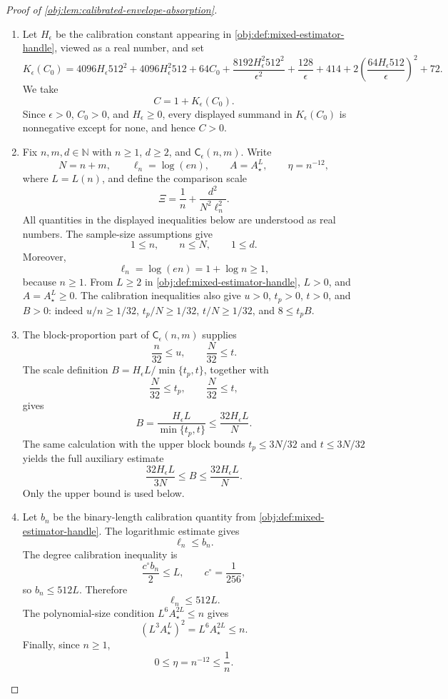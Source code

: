 \begin{proof}[Proof of \cref{obj:lem:calibrated-envelope-absorption}]
\begin{enumerate}
\item Let \(H_\epsilon\) be the calibration constant appearing in \cref{obj:def:mixed-estimator-handle}, viewed as a real number, and set
\[
K_\epsilon(C_0)
=
4096H_\epsilon 512^2+4096H_\epsilon^2 512+64C_0
+\frac{8192H_\epsilon^2 512^2}{\epsilon^2}
+\frac{128}{\epsilon}+414
+2\left(\frac{64H_\epsilon 512}{\epsilon}\right)^2+72 .
\]
We take
\[
C=1+K_\epsilon(C_0).
\]
Since \(\epsilon>0\), \(C_0>0\), and \(H_\epsilon\ge0\), every displayed summand in \(K_\epsilon(C_0)\) is nonnegative except for none, and hence \(C>0\). %

\item Fix \(n,m,d\in\mathbb N\) with \(n\ge1\), \(d\ge2\), and \(\mathsf C_\epsilon(n,m)\). Write
\[
N=n+m,\qquad \ell_n=\log(en),\qquad A=A_\star^L,\qquad \eta=n^{-12},
\]
where \(L=L(n)\), and define the comparison scale
\[
\Xi
=
\frac1n+\frac{d^2}{N^2\ell_n^2}.
\]
All quantities in the displayed inequalities below are understood as real numbers. The sample-size assumptions give
\[
1\le n,\qquad n\le N,\qquad 1\le d.
\]
Moreover,
\[
\ell_n=\log(en)=1+\log n\ge1,
\]
because \(n\ge1\). From \(L\ge2\) in \cref{obj:def:mixed-estimator-handle}, \(L>0\), and \(A=A_\star^L\ge0\). The calibration inequalities also give \(u>0\), \(t_p>0\), \(t>0\), and \(B>0\): indeed \(u/n\ge1/32\), \(t_p/N\ge1/32\), \(t/N\ge1/32\), and \(8\le t_pB\). %

\item The block-proportion part of \(\mathsf C_\epsilon(n,m)\) supplies
\[
\frac{n}{32}\le u,
\qquad
\frac{N}{32}\le t .
\]
The scale definition \(B=H_\epsilon L/\min\{t_p,t\}\), together with
\[
\frac{N}{32}\le t_p,\qquad \frac{N}{32}\le t,
\]
gives
\[
B
=
\frac{H_\epsilon L}{\min\{t_p,t\}}
\le
\frac{32H_\epsilon L}{N}.
\]
The same calculation with the upper block bounds \(t_p\le3N/32\) and \(t\le3N/32\) yields the full auxiliary estimate
\[
\frac{32H_\epsilon L}{3N}\le B\le \frac{32H_\epsilon L}{N}.
\]
Only the upper bound is used below. %

\item Let \(b_n\) be the binary-length calibration quantity from \cref{obj:def:mixed-estimator-handle}. The logarithmic estimate gives
\[
\ell_n\le b_n.
\]
The degree calibration inequality is
\[
\frac{c^\circ b_n}{2}\le L,
\qquad c^\circ=\frac1{256},
\]
so \(b_n\le512L\). Therefore
\[
\ell_n\le512L.
\]
The polynomial-size condition \(L^6A_\star^{2L}\le n\) gives
\[
(L^3A_\star^L)^2=L^6A_\star^{2L}\le n.
\]
Finally, since \(n\ge1\),
\[
0\le \eta=n^{-12}\le \frac1n .
\]


\end{enumerate}
\end{proof}
